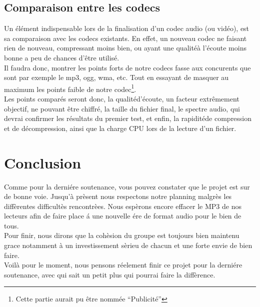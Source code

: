 \documentclass[a4paper,12pt]{article}
\begin{document}
	\subsection{Comparaison entre les codecs}
Un \'el\'ement indispensable lors de la finalisation d'un codec audio (ou vid\'eo),
est sa comparaison avec les codecs existants. En effet, un nouveau codec ne
faisant rien de nouveau, compressant moins bien, ou ayant une qualit\'eà l'\'ecoute
moins bonne a peu de chances d'\^etre utilis\'e.\\
Il faudra donc, montrer les points forts de notre codecs fasse aux concurents
que sont par exemple le mp3, ogg, wma, etc. Tout en essayant de masquer au
maximum les points faible de notre codec\footnote{Cette partie aurait pu \^etre
nomm\'ee ``Publicit\'e''}.\\
Les points compar\'es seront donc, la qualit\'ed'\'ecoute, un facteur extr\^emement
objectif, ne pouvant \^etre chiffr\'e, la taille du fichier final, le spectre audio,
qui devrai confirmer les r\'esultats du premier test, et enfin, la rapidit\'ede
compression et de d\'ecompression, ainsi que la charge CPU lors de la lecture d'un
fichier.

\newpage

\section*{Conclusion}
Comme pour la derni\'ere soutenance, vous pouvez constater que le projet est sur de bonne voie. Jusqu'\`a pr\`esent nous respectons notre planning malgr\`es les diff\`erentes difficult\`es rencontr\`ees. Nous esp\`erons encore effacer le MP3 de nos lecteurs afin de faire place \'a une nouvelle \'ere de format audio pour le bien de tous.\\
Pour finir, nous dirons que la coh\`esion du groupe est toujours bien maintenu grace notamment \`a un investissement s\`erieu de chacun et une forte envie de bien faire.\\
Voil\`a pour le moment, nous pensons r\'eelement finir ce projet pour la derni\'ere soutenance, avec qui sait un petit plus qui pourrai faire la diff\`erence. 
\end{document}

